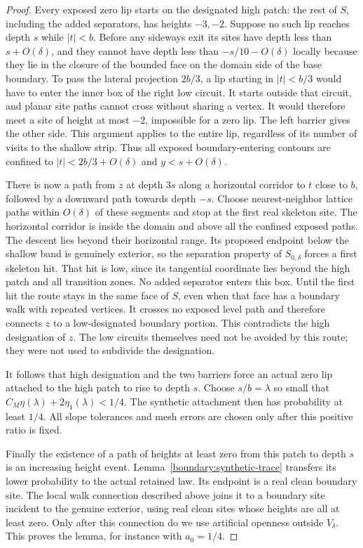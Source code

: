 \begin{proof}
Every exposed zero lip starts on the designated high patch: the
rest of $S$, including the added separators, has heights $-3,-2$.
Suppose no such lip reaches depth $s$ while $|t|<b$.  Before any
sideways exit its sites have depth less than $s+O(\delta)$, and
they cannot have depth less than $-s/10-O(\delta)$ locally because
they lie in the closure of the bounded face on the domain side of
the base boundary.  To pass the lateral projection $2b/3$, a lip
starting in $|t|<b/3$ would have to enter the inner box of the right
low circuit.  It starts outside that circuit, and planar site paths
cannot cross without sharing a vertex.  It would therefore meet a
site of height at most $-2$, impossible for a zero lip.  The left
barrier gives the other side.  This argument applies to the entire
lip, regardless of its number of visits to the shallow strip.
Thus all exposed boundary-entering contours are confined to
$|t|<2b/3+O(\delta)$ and $y<s+O(\delta)$.

There is now a path from $z$ at depth $3s$ along a horizontal
corridor to $t$ close to $b$, followed by a downward path towards
depth $-s$.  Choose nearest-neighbor lattice paths within
$O(\delta)$ of these segments and stop at the first real skeleton
site.  The horizontal corridor is inside the domain and above all
the confined exposed paths.  The descent lies beyond their
horizontal range.  Its proposed endpoint below the shallow band is
genuinely exterior, so the separation property of $S_{0,\delta}$
forces a first skeleton hit.  That hit is low, since its tangential
coordinate lies beyond the high patch and all transition zones.
No added separator enters this box.  Until the first hit the route
stays in the same face of $S$, even when that face has a boundary
walk with repeated vertices.  It crosses no exposed level path and
therefore connects $z$ to a low-designated boundary portion.  This
contradicts the high designation of $z$.  The low circuits themselves
need not be avoided by this route; they were not used to subdivide
the designation.

It follows that high designation and the two barriers force an
actual zero lip attached to the high patch to rise to depth $s$.
Choose $s/b=\lambda$ so small that
$C_M\eta(\lambda)+2\eta_1(\lambda)<1/4$.
The synthetic attachment then has probability at least $1/4$.
All slope tolerances and mesh errors are chosen only after this
positive ratio is fixed.

Finally the existence of a path of heights at least zero from this
patch to depth $s$ is an increasing height event.
Lemma~\ref{boundary:synthetic-trace} transfers its lower probability
to the actual retained law.  Its endpoint is a real clean boundary
site.  The local walk connection described above joins it to a
boundary site incident to the genuine exterior, using real clean
sites whose heights are all at least zero.  Only after this
connection do we use artificial openness outside $V_\delta$.
This proves the lemma, for instance with $a_0=1/4$.
\end{proof}

